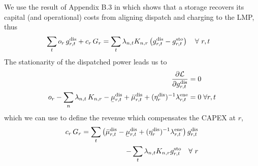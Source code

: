 \documentclass[11pt,twocolumn]{article}
\newcommand{\ubar}[1]{\underaccent{\bar}{#1}}
\newcommand{\Forall}[1]{\hspace{10pt} \forall \,\, #1 }
\newcommand{\pdv}[2]{\frac{\partial #1}{\partial #2}}
\newcommand{\storage}{g_{r,t}}
\newcommand{\storagedispatch}{\storage^\text{dis}}
\newcommand{\storagecharge}{\storage^\text{sto}}
\newcommand{\storagesoc}{\storage^\text{ene}}
\newcommand{\efficiency}{\eta_{r}}
\newcommand{\efficiencydispatch}{\efficiency^\text{dis}}
\newcommand{\efficiencycharge}{\efficiency^\text{sto}}
\newcommand{\efficiencysoc}{\efficiency^\text{ene}}
\newcommand{\operationalpricestorage}{o_r}
\newcommand{\capitalpricestorage}{c_r}
\newcommand{\capacitystorage}{G_r}
\newcommand{\mulowerstoragedispatch}{\ubar{\mu}_{r,t}^\text{dis}}
\newcommand{\muupperstoragedispatch}{\bar{\mu}_{r,t}^\text{dis}}
\newcommand{\mulowerstoragecharge}{\ubar{\mu}_{r,t}^\text{sto}}
\newcommand{\muupperstoragecharge}{\bar{\mu}_{r,t}^\text{sto}}
\newcommand{\mulowerstoragesoc}{\ubar{\mu}_{r,t}^\text{ene}}
\newcommand{\muupperstoragesoc}{\bar{\mu}_{r,t}^\text{ene}}
\newcommand{\mustateofcharge}{\lambda^\text{ene}_{r,t}}
\newcommand{\munextstateofcharge}{\lambda^\text{ene}_{r,t+1}}
\newcommand{\lagrangian}{\mathcal{L}}
\newcommand{\lmp}[1][n]{\lambda_{#1,t}}
\newcommand{\incidencestorage}[1][n]{K_{#1,r}}
\begin{document}
We use the result of Appendix B.3 in \cite{brown_decreasing_2020} which shows that a storage recovers its capital (and operational) costs from aligning dispatch and charging to the LMP, thus 
\begin{align}
    \notag
    \sum_t \operationalpricestorage \, \storagedispatch + \capitalpricestorage \, \capacitystorage = \sum_t \lmp \incidencestorage &\left(\storagedispatch - \storagecharge \right) \Forall{r,t}
\end{align}
The stationarity of the dispatched power leads us to  
\begin{align}
    \notag
    \pdv{\lagrangian}{\storagedispatch} &= 0 \\
    \operationalpricestorage - \sum_n \lmp \, \incidencestorage - \mulowerstoragedispatch + \muupperstoragedispatch + (\efficiencydispatch )^{-1} \mustateofcharge &= 0 \;  \forall r,t
    \label{eq:stationarity_storagedispatch}
\end{align}
which we  can use to define the revenue which compensates the CAPEX at $r$, 
\begin{align}
    \notag
    \capitalpricestorage \, \capacitystorage = \sum_t \left(\muupperstoragedispatch - \mulowerstoragedispatch  + (\efficiencydispatch )^{-1} \mustateofcharge \right) \storagedispatch \\
    - \sum_t \lmp \incidencestorage  \storagecharge \Forall{r} 
    \label{eq:no_profit_capex_storage2}
\end{align}

\end{document}
